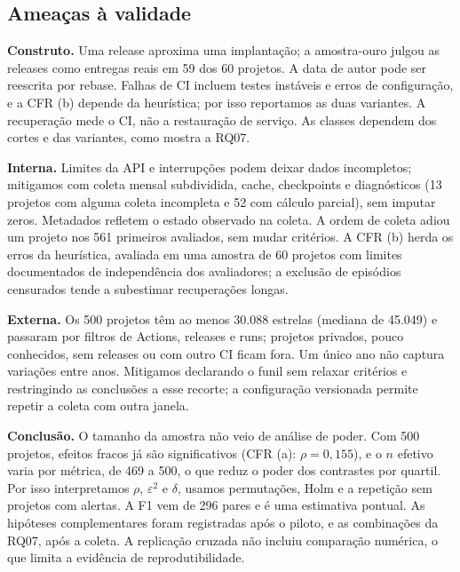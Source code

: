 \subsection{Ameaças à validade}
\textbf{Construto.} Uma release aproxima uma implantação; a amostra-ouro
julgou as releases como entregas reais em 59 dos 60 projetos. A data de autor
pode ser reescrita por rebase. Falhas de CI incluem testes instáveis e erros
de configuração, e a CFR (b) depende da heurística; por isso reportamos as duas
variantes. A recuperação mede o CI, não a restauração de serviço. As classes
dependem dos cortes e das variantes, como mostra a RQ07.

\textbf{Interna.} Limites da API e interrupções podem deixar dados
incompletos; mitigamos com coleta mensal subdividida, cache, checkpoints e
diagnósticos (13 projetos com alguma coleta incompleta e 52 com cálculo
parcial), sem imputar zeros. Metadados refletem o estado observado na coleta.
A ordem de coleta adiou um projeto nos 561 primeiros avaliados, sem mudar
critérios. A CFR (b) herda os erros da heurística, avaliada em uma amostra de
60 projetos com limites documentados de independência dos avaliadores; a
exclusão de episódios censurados tende a subestimar recuperações longas.

\textbf{Externa.} Os 500 projetos têm ao menos 30.088 estrelas (mediana de
45.049) e passaram por filtros de Actions, releases e runs; projetos privados,
pouco conhecidos, sem releases ou com outro CI ficam fora. Um único ano não
captura variações entre anos. Mitigamos declarando o funil sem relaxar
critérios e restringindo as conclusões a esse recorte; a configuração
versionada permite repetir a coleta com outra janela.

\textbf{Conclusão.} O tamanho da amostra não veio de análise de poder. Com
500 projetos, efeitos fracos já são significativos (CFR (a): $\rho=0,155$), e o
$n$ efetivo varia por métrica, de 469 a 500, o que reduz o poder dos
contrastes por quartil. Por isso interpretamos $\rho$, $\varepsilon^2$ e
$\delta$, usamos permutações, Holm e a repetição sem projetos com alertas. A
F1 vem de 296 pares e é uma estimativa pontual. As hipóteses complementares
foram registradas após o piloto, e as combinações da RQ07, após a coleta. A
replicação cruzada não incluiu comparação numérica, o que limita a evidência
de reprodutibilidade.
